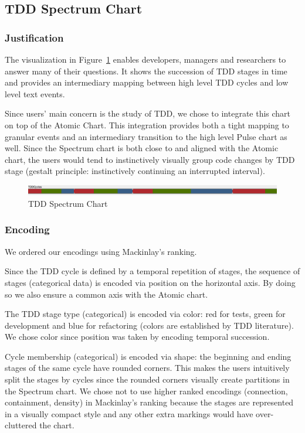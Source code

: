 \documentclass[journal]{vgtc}                %
\begin{document}
\subsection{TDD Spectrum Chart}
\label{sec:spectrum}

\subsubsection{Justification}

The visualization in Figure~\ref{fig:two} enables developers, managers and researchers to answer many of their questions. It shows the succession of TDD stages in time and provides an intermediary mapping between high level TDD cycles and low level text events. 

Since users' main concern is the study of TDD, we chose to integrate this chart on top of the Atomic Chart.
This integration provides both a tight mapping to granular events and an intermediary transition to the high level Pulse chart as well.
Since the Spectrum chart is both close to and aligned with the Atomic chart, the users would tend to instinctively visually group code changes by TDD stage (gestalt principle: instinctively continuing an interrupted interval).

\begin{figure}
	\includegraphics[width=\textwidth]{fig2.png}
	\caption{TDD Spectrum Chart}
	\label{fig:two}
\end{figure}

\subsubsection{Encoding}

We ordered our encodings using Mackinlay's ranking.

Since the TDD cycle is defined by a temporal repetition of stages, the sequence of stages (categorical data) is encoded via position on the horizontal axis.
By doing so we also ensure a common axis with the Atomic chart.

The TDD stage type (categorical) is encoded via color: red for tests, green for development and blue for refactoring (colors are established by TDD literature). We chose color since position was taken by encoding temporal succession.



Cycle membership (categorical) is encoded via shape: the beginning and ending stages of the same cycle have rounded corners.
This makes the users intuitively split the stages by cycles since the rounded corners visually create partitions in the Spectrum chart.
We chose not to use higher ranked encodings (connection, containment, density) in Mackinlay's ranking because the stages are represented in a visually compact style and any other extra markings would have over-cluttered the chart.
\end{document}
